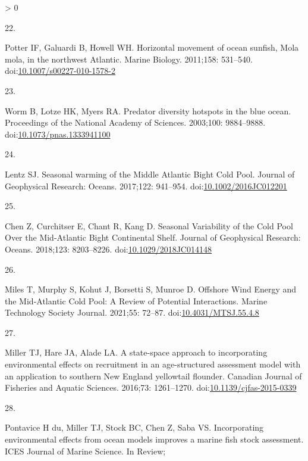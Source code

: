 \documentclass[
  10pt,
]{article}
\newlength{\cslhangindent}
\newlength{\csllabelwidth}
\newenvironment{CSLReferences}[2] %
 {%
  \setlength{\parindent}{0pt}
  \ifodd #1 \everypar{\setlength{\hangindent}{\cslhangindent}}\ignorespaces\fi
  \ifnum #2 > 0
  \setlength{\parskip}{#2\baselineskip}
  \fi
 }%
 {}
\newcommand{\CSLLeftMargin}[1]{\parbox[t]{\csllabelwidth}{#1}}
\newcommand{\CSLRightInline}[1]{\parbox[t]{\linewidth - \csllabelwidth}{#1}\break}
\begin{document}
\begin{CSLReferences}{0}{0}
\leavevmode\hypertarget{ref-potter_horizontal_2011}{}%
\CSLLeftMargin{22. }
\CSLRightInline{Potter IF, Galuardi B, Howell WH. Horizontal movement of
ocean sunfish, {Mola} mola, in the northwest {Atlantic}. Marine Biology.
2011;158: 531--540.
doi:\href{https://doi.org/10.1007/s00227-010-1578-2}{10.1007/s00227-010-1578-2}}

\leavevmode\hypertarget{ref-worm_predator_2003}{}%
\CSLLeftMargin{23. }
\CSLRightInline{Worm B, Lotze HK, Myers RA. Predator diversity hotspots
in the blue ocean. Proceedings of the National Academy of Sciences.
2003;100: 9884--9888.
doi:\href{https://doi.org/10.1073/pnas.1333941100}{10.1073/pnas.1333941100}}

\leavevmode\hypertarget{ref-lentz_seasonal_2017}{}%
\CSLLeftMargin{24. }
\CSLRightInline{Lentz SJ. Seasonal warming of the {Middle} {Atlantic}
{Bight} {Cold} {Pool}. Journal of Geophysical Research: Oceans.
2017;122: 941--954.
doi:\href{https://doi.org/10.1002/2016JC012201}{10.1002/2016JC012201}}

\leavevmode\hypertarget{ref-chen_seasonal_2018}{}%
\CSLLeftMargin{25. }
\CSLRightInline{Chen Z, Curchitser E, Chant R, Kang D. Seasonal
{Variability} of the {Cold} {Pool} {Over} the {Mid}-{Atlantic} {Bight}
{Continental} {Shelf}. Journal of Geophysical Research: Oceans.
2018;123: 8203--8226.
doi:\href{https://doi.org/10.1029/2018JC014148}{10.1029/2018JC014148}}

\leavevmode\hypertarget{ref-miles_offshore_2021}{}%
\CSLLeftMargin{26. }
\CSLRightInline{Miles T, Murphy S, Kohut J, Borsetti S, Munroe D.
Offshore {Wind} {Energy} and the {Mid}-{Atlantic} {Cold} {Pool}: {A}
{Review} of {Potential} {Interactions}. Marine Technology Society
Journal. 2021;55: 72--87.
doi:\href{https://doi.org/10.4031/MTSJ.55.4.8}{10.4031/MTSJ.55.4.8}}

\leavevmode\hypertarget{ref-miller_state-space_2016}{}%
\CSLLeftMargin{27. }
\CSLRightInline{Miller TJ, Hare JA, Alade LA. A state-space approach to
incorporating environmental effects on recruitment in an age-structured
assessment model with an application to southern {New} {England}
yellowtail flounder. Canadian Journal of Fisheries and Aquatic Sciences.
2016;73: 1261--1270.
doi:\href{https://doi.org/10.1139/cjfas-2015-0339}{10.1139/cjfas-2015-0339}}

\leavevmode\hypertarget{ref-du_pontavice_incorporating_nodate}{}%
\CSLLeftMargin{28. }
\CSLRightInline{Pontavice H du, Miller TJ, Stock BC, Chen Z, Saba VS.
Incorporating environmental effects from ocean models improves a marine
fish stock assessment. ICES Journal of Marine Science. In Review; }


\end{CSLReferences}
\end{document}
